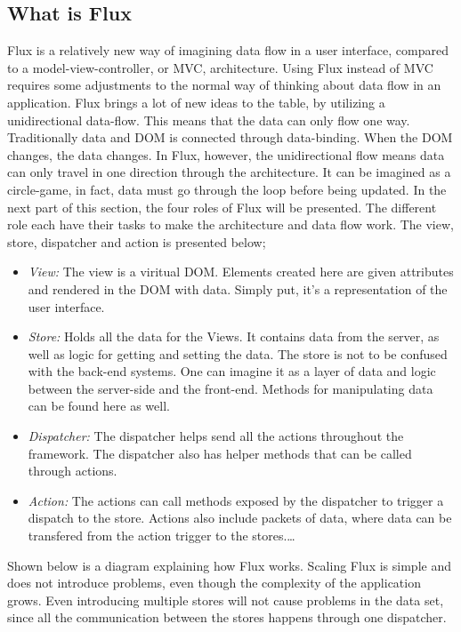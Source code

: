 \subsection{What is Flux}
Flux is a relatively new way of imagining data flow in a user interface, compared to a model-view-controller, or MVC, architecture. Using Flux instead of MVC requires some adjustments to the normal way of thinking about data flow in an application. Flux brings a lot of new ideas to the table, by utilizing a unidirectional data-flow. This means that the data can only flow one way. Traditionally data and DOM is connected through data-binding. When the DOM changes, the data changes. In Flux, however, the unidirectional flow means data can only travel in one direction through the architecture. It can be imagined as a circle-game, in fact, data must go through the loop before being updated. In the next part of this section, the four roles of Flux will be presented. The different role each have their tasks to make the architecture and data flow work. The view, store, dispatcher and action is presented below;

\begin{itemize}  
\item \emph{View:} The view is a viritual DOM. Elements created here are given attributes and rendered in the DOM with data. Simply put, it's a representation of the user interface.
\item \emph{Store:} Holds all the data for the Views. It contains data from the server, as well as logic for getting and setting the data. The store is not to be confused with the back-end systems. One can imagine it as a layer of data and logic between the server-side and the front-end. Methods for manipulating data can be found here as well.
\item \emph{Dispatcher:} The dispatcher helps send all the actions throughout the framework. The dispatcher also has helper methods that can be called through actions.
\item \emph{Action:} The actions can call methods exposed by the dispatcher to trigger a dispatch to the store. Actions also include packets of data, where data can be transfered from the action trigger to the stores.\ldots 
\end{itemize}

Shown below is a diagram explaining how Flux works. Scaling Flux is simple and does not introduce problems, even though the complexity of the application grows. Even introducing multiple stores will not cause problems in the data set, since all the communication between the stores happens through one dispatcher.

